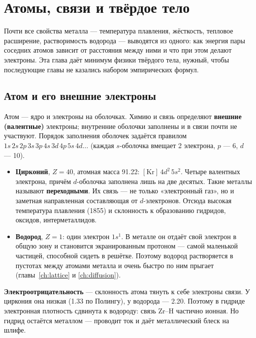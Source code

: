 \chapter{Атомы, связи и твёрдое тело}\label{ch:atoms}

Почти все свойства металла --- температура плавления, жёсткость, тепловое расширение, растворимость водорода ---
выводятся из одного: как энергия пары соседних атомов зависит от расстояния между ними и что при этом делают
электроны. Эта глава даёт минимум физики твёрдого тела, нужный, чтобы последующие главы не казались набором
эмпирических формул.

\section{Атом и его внешние электроны}

Атом --- ядро и электроны на оболочках. Химию и связь определяют \textbf{внешние (валентные)} электроны; внутренние
оболочки заполнены и в связи почти не участвуют. Порядок заполнения оболочек задаётся правилом
$1s\,2s\,2p\,3s\,3p\,4s\,3d\,4p\,5s\,4d\ldots$ (каждая $s$-оболочка вмещает 2 электрона, $p$ --- 6, $d$ --- 10).

\begin{itemize}
\item \textbf{Цирконий}, $Z = 40$, атомная масса 91.22: $[\mathrm{Kr}]\,4d^2\,5s^2$. Четыре валентных электрона, причём
  $d$-оболочка заполнена лишь на две десятых. Такие металлы называют \textbf{переходными}. Их связь --- не только
  «электронный газ», но и заметная направленная составляющая от $d$-электронов. Отсюда высокая температура
  плавления (1855\degC) и склонность к образованию гидридов, оксидов, интерметаллидов.
\item \textbf{Водород}, $Z = 1$: один электрон $1s^1$. В металле он отдаёт свой электрон в общую зону и становится
  экранированным протоном --- самой маленькой частицей, способной сидеть в решётке. Поэтому водород растворяется в
  пустотах между атомами металла и очень быстро по ним прыгает (главы~\ref{ch:lattice} и \ref{ch:diffusion}).
\end{itemize}

\textbf{Электроотрицательность} --- склонность атома тянуть к себе электроны связи. У циркония она низкая (1.33 по
Полингу), у водорода --- 2.20. Поэтому в гидриде электронная плотность сдвинута к водороду: связь Zr--H частично
ионная. Но гидрид остаётся металлом --- проводит ток и даёт металлический блеск на шлифе.

